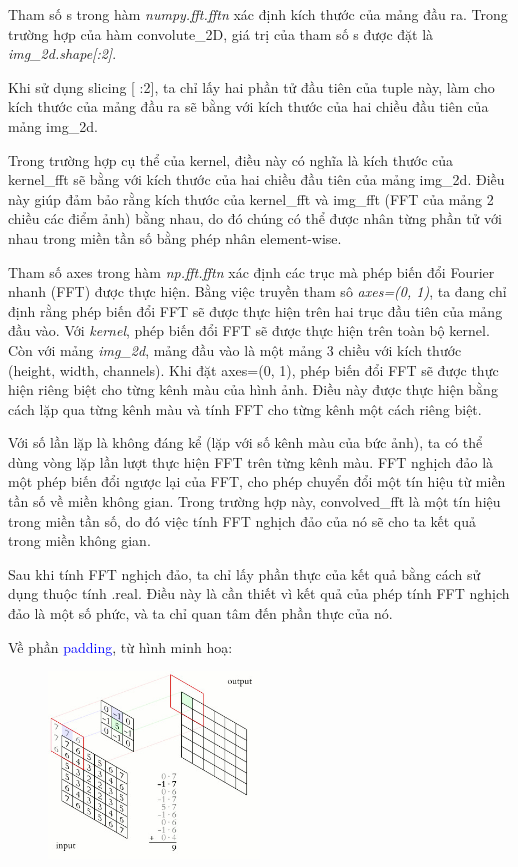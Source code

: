 \documentclass[]{article}
\begin{document}
Tham số s trong hàm \textit{numpy.fft.fftn} xác định kích thước của mảng đầu ra. Trong trường hợp của hàm convolute\_2D, giá trị của tham số s được đặt là \textit{img\_2d.shape[:2]}. \par 

Khi sử dụng slicing [ :2], ta chỉ lấy hai phần tử đầu tiên của tuple này, làm cho kích thước của mảng đầu ra sẽ bằng với kích thước của hai chiều đầu tiên của mảng img\_2d. \par

Trong trường hợp cụ thể của kernel, điều này có nghĩa là kích thước của kernel\_fft sẽ bằng với kích thước của hai chiều đầu tiên của mảng img\_2d. Điều này giúp đảm bảo rằng kích thước của kernel\_fft và img\_fft (FFT của mảng 2 chiều các điểm ảnh) bằng nhau, do đó chúng có thể được nhân từng phần tử với nhau trong miền tần số bằng phép nhân element-wise. \par

Tham số axes trong hàm \textit{np.fft.fftn} xác định các trục mà phép biến đổi Fourier nhanh (FFT) được thực hiện. Bằng việc truyền tham sô \textit{axes=(0, 1)}, ta đang chỉ định rằng phép biến đổi FFT sẽ được thực hiện trên hai trục đầu tiên của mảng đầu vào. Với \textit{kernel}, phép biến đổi FFT sẽ được thực hiện trên toàn bộ kernel. Còn với mảng \textit{img\_2d}, mảng đầu vào là một mảng 3 chiều với kích thước (height, width, channels). Khi đặt axes=(0, 1), phép biến đổi FFT sẽ được thực hiện riêng biệt cho từng kênh màu của hình ảnh. Điều này được thực hiện bằng cách lặp qua từng kênh màu và tính FFT cho từng kênh một cách riêng biệt. \par

Với số lần lặp là không đáng kể (lặp với số kênh màu của bức ảnh), ta có thể dùng vòng lặp lần lượt thực hiện FFT trên từng kênh màu. FFT nghịch đảo là một phép biến đổi ngược lại của FFT, cho phép chuyển đổi một tín hiệu từ miền tần số về miền không gian. Trong trường hợp này, convolved\_fft là một tín hiệu trong miền tần số, do đó việc tính FFT nghịch đảo của nó sẽ cho ta kết quả trong miền không gian.

Sau khi tính FFT nghịch đảo, ta chỉ lấy phần thực của kết quả bằng cách sử dụng thuộc tính .real. Điều này là cần thiết vì kết quả của phép tính FFT nghịch đảo là một số phức, và ta chỉ quan tâm đến phần thực của nó. \par

Về phần \textcolor{blue}{padding}, từ hình minh hoạ:
\begin{figure}[!ht]
  \centering
  \includegraphics[width = 0.5\textwidth]{image/padding.jpg}
\end{figure}
\par
\end{document}
